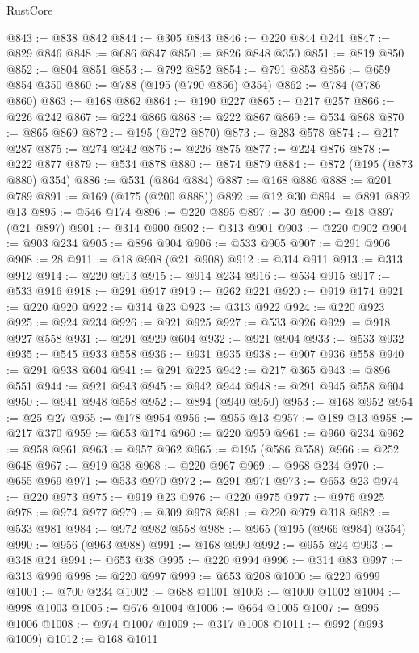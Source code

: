 \begin{lexlean}{RustCore}
\begin{coremodule}
@843 := @838 @842
@844 := @305 @843
@846 := @220 @844 @241
@847 := @829 @846
@848 := @686 @847
@850 := @826 @848 @350
@851 := @819 @850
@852 := @804 @851
@853 := @792 @852
@854 := @791 @853
@856 := @659 @854 @350
@860 := @788 (@195 (@790 @856) @354)
@862 := @784 (@786 @860)
@863 := @168 @862
@864 := @190 @227
@865 := @217 @257
@866 := @226 @242
@867 := @224 @866
@868 := @222 @867
@869 := @534 @868
@870 := @865 @869
@872 := @195 (@272 @870)
@873 := @283 @578
@874 := @217 @287
@875 := @274 @242
@876 := @226 @875
@877 := @224 @876
@878 := @222 @877
@879 := @534 @878
@880 := @874 @879
@884 := @872 (@195 (@873 @880) @354)
@886 := @531 (@864 @884)
@887 := @168 @886
@888 := @201 @789
@891 := @169 (@175 (@200 @888))
@892 := @12 @30
@894 := @891 @892 @13
@895 := @546 @174
@896 := @220 @895
@897 := 30
@900 := @18 @897 (@21 @897)
@901 := @314 @900
@902 := @313 @901
@903 := @220 @902
@904 := @903 @234
@905 := @896 @904
@906 := @533 @905
@907 := @291 @906
@908 := 28
@911 := @18 @908 (@21 @908)
@912 := @314 @911
@913 := @313 @912
@914 := @220 @913
@915 := @914 @234
@916 := @534 @915
@917 := @533 @916
@918 := @291 @917
@919 := @262 @221
@920 := @919 @174
@921 := @220 @920
@922 := @314 @23
@923 := @313 @922
@924 := @220 @923
@925 := @924 @234
@926 := @921 @925
@927 := @533 @926
@929 := @918 @927 @558
@931 := @291 @929 @604
@932 := @921 @904
@933 := @533 @932
@935 := @545 @933 @558
@936 := @931 @935
@938 := @907 @936 @558
@940 := @291 @938 @604
@941 := @291 @225
@942 := @217 @365
@943 := @896 @551
@944 := @921 @943
@945 := @942 @944
@948 := @291 @945 @558 @604
@950 := @941 @948 @558
@952 := @894 (@940 @950)
@953 := @168 @952
@954 := @25 @27
@955 := @178 @954
@956 := @955 @13
@957 := @189 @13
@958 := @217 @370
@959 := @653 @174
@960 := @220 @959
@961 := @960 @234
@962 := @958 @961
@963 := @957 @962
@965 := @195 (@586 @558)
@966 := @252 @648
@967 := @919 @38
@968 := @220 @967
@969 := @968 @234
@970 := @655 @969
@971 := @533 @970
@972 := @291 @971
@973 := @653 @23
@974 := @220 @973
@975 := @919 @23
@976 := @220 @975
@977 := @976 @925
@978 := @974 @977
@979 := @309 @978
@981 := @220 @979 @318
@982 := @533 @981
@984 := @972 @982 @558
@988 := @965 (@195 (@966 @984) @354)
@990 := @956 (@963 @988)
@991 := @168 @990
@992 := @955 @24
@993 := @348 @24
@994 := @653 @38
@995 := @220 @994
@996 := @314 @83
@997 := @313 @996
@998 := @220 @997
@999 := @653 @208
@1000 := @220 @999
@1001 := @700 @234
@1002 := @688 @1001
@1003 := @1000 @1002
@1004 := @998 @1003
@1005 := @676 @1004
@1006 := @664 @1005
@1007 := @995 @1006
@1008 := @974 @1007
@1009 := @317 @1008
@1011 := @992 (@993 @1009)
@1012 := @168 @1011

\end{coremodule}
\end{lexlean}
